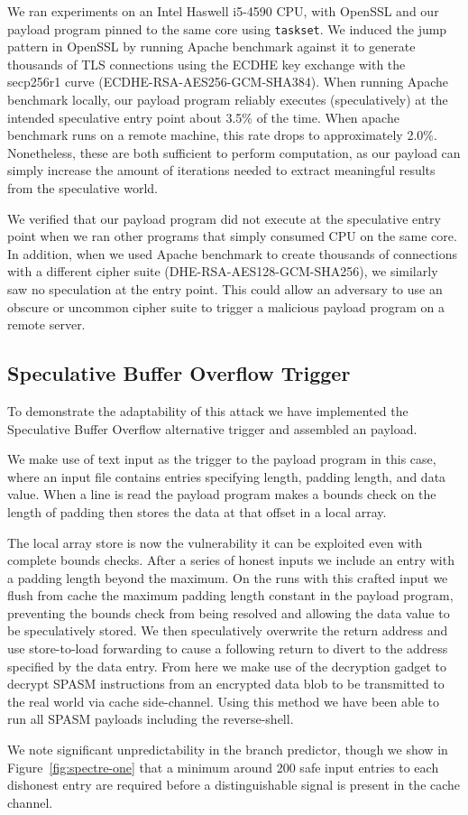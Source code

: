 We ran experiments on an Intel Haswell i5-4590 CPU, with OpenSSL and our payload
program pinned to the same core using \texttt{taskset}. We induced the jump
pattern in OpenSSL by running Apache benchmark against it to generate thousands
of TLS connections using the ECDHE key exchange with the secp256r1 curve
(ECDHE-RSA-AES256-GCM-SHA384). When running Apache benchmark locally, our
payload program reliably executes (speculatively) at the intended speculative
entry point about 3.5\% of the time. When apache benchmark runs on a remote
machine, this rate drops to approximately 2.0\%. Nonetheless, these are both
sufficient to perform computation, as our payload can simply increase the amount
of iterations needed to extract meaningful results from the speculative world.

We verified that our payload program did not execute at the speculative entry
point when we ran other programs that simply consumed CPU on the same core. In
addition, when we used Apache benchmark to create thousands of connections with
a different cipher suite (DHE-RSA-AES128-GCM-SHA256), we similarly saw no
speculation at the entry point. This could allow an adversary to use an obscure
or uncommon cipher suite to trigger a malicious \speculake payload program on a
remote server.



\subsection{Speculative Buffer Overflow Trigger}
\label{subsec:sbo-impl}


To demonstrate the adaptability of this attack we have implemented the 
Speculative Buffer Overflow alternative trigger and assembled an \speculake 
payload. 

We make use of text input as the trigger to the payload program in this case,
where an input file contains entries specifying length, padding length,
and data value. When a line is read the payload program makes a bounds
check on the length of padding then stores the data at that offset in a
local array. 

The local array store is now the vulnerability it can be exploited even with
complete bounds checks. After a series of honest inputs we include an entry with
a padding length beyond the maximum. On the runs with this crafted input we
flush from cache the maximum padding length constant in the payload program,
preventing the bounds check from being resolved and allowing the data value to
be speculatively stored. We then speculatively overwrite the return address and
use store-to-load forwarding to cause a following return to divert to the
address specified by the data entry. From here we make use of the decryption
gadget to decrypt SPASM instructions from an encrypted data blob to be
transmitted to the real world via cache side-channel. Using this method we have
been able to run all SPASM payloads including the reverse-shell. 

We note significant unpredictability in the branch predictor, though we
show in Figure~\ref{fig:spectre-one} that a minimum around 200 safe input entries
to each dishonest entry are required before a distinguishable signal is present 
in the cache channel. 
\fi
